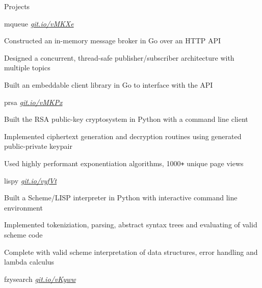 \documentclass{resume} %
\begin{document}
\begin{rSection}{Projects}
  \begin{rSubsection}{mqueue}
	  {\em {\href{http://github.com/ridwanmsharif/mqueue}
		    {git.io/vMKXe}}}
	  {}

    \item Constructed an in-memory message broker in Go
			  over an HTTP API
    \item Designed a concurrent, thread-safe publisher/subscriber
		  architecture with multiple topics
    \item Built an embeddable client library in Go to interface with the API
        
  \end{rSubsection}

  \begin{rSubsection}{prsa}
	  {\em {\href{http://github.com/ridwanmsharif/prsa}
		    {git.io/vMKPx}}}
	  {}

    \item Built the RSA public-key cryptosystem in Python with a
			  command line client
    \item Implemented ciphertext generation and decryption routines using
		  generated public-private keypair
    \item Used highly performant exponentiation algorithms,
		  1000\texttt{+} unique page views
  \end{rSubsection}

  \begin{rSubsection}{lispy}
	  {\em {\href{http://github.com/ridwanmsharif/lispy}
		    {git.io/vyfVt}}}
	  {}

    \item Built a Scheme/LISP interpreter in Python with interactive command line environment
    \item Implemented tokeniziation, parsing, abstract syntax trees and evaluating of valid scheme code
    \item Complete with valid scheme interpretation of data structures, error handling and lambda calculus
  \end{rSubsection}

  \begin{rSubsection}{fzysearch}
	  {\em{ \href{http://github.com/ridwanmsharif/fzysearch}
		    {git.io/vKyww}}}
	  {}


\end{rSubsection}
\end{rSection}
\end{document}
